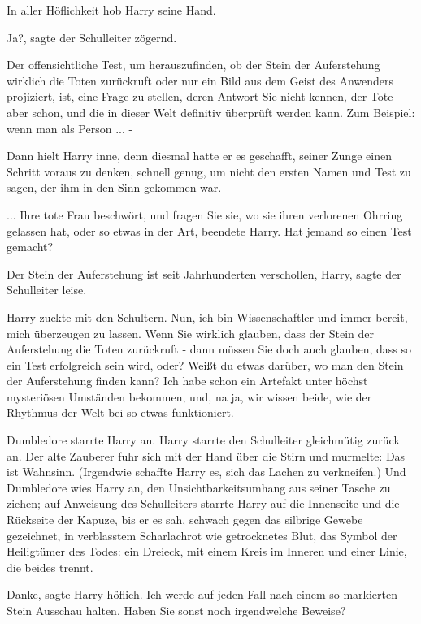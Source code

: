 In aller Höflichkeit hob Harry seine Hand.

\glqq{}Ja?\grqq{}, sagte der Schulleiter zögernd.

\glqq{}Der offensichtliche Test, um herauszufinden, ob der Stein der Auferstehung
wirklich die Toten zurückruft oder nur ein Bild aus dem Geist des Anwenders
projiziert, ist, eine Frage zu stellen, deren Antwort Sie nicht kennen, der Tote
aber schon, und die in dieser Welt definitiv überprüft werden kann. Zum
Beispiel: wenn man als Person ... -\grqq{}

Dann hielt Harry inne, denn diesmal hatte er es geschafft, seiner Zunge einen
Schritt voraus zu denken, schnell genug, um nicht den ersten Namen und Test zu
sagen, der ihm in den Sinn gekommen war.

\glqq{}... Ihre tote Frau beschwört, und fragen Sie sie, wo sie ihren verlorenen
Ohrring gelassen hat, oder so etwas in der Art\grqq{}, beendete Harry. \glqq{}Hat
jemand so einen Test gemacht?\grqq{}

\glqq{}Der Stein der Auferstehung ist seit Jahrhunderten verschollen,
Harry\grqq{}, sagte der Schulleiter leise.

Harry zuckte mit den Schultern. \glqq{}Nun, ich bin Wissenschaftler und immer
bereit, mich überzeugen zu lassen. Wenn Sie wirklich glauben, dass der Stein der
Auferstehung die Toten zurückruft - dann müssen Sie doch auch glauben, dass so
ein Test erfolgreich sein wird, oder? Weißt du etwas darüber, wo man den Stein
der Auferstehung finden kann? Ich habe schon ein Artefakt unter höchst
mysteriösen Umständen bekommen, und, na ja, wir wissen beide, wie der Rhythmus
der Welt bei so etwas funktioniert.\grqq{}

Dumbledore starrte Harry an. Harry starrte den Schulleiter gleichmütig zurück
an. Der alte Zauberer fuhr sich mit der Hand über die Stirn und murmelte: \glqq{}
Das ist Wahnsinn.\grqq{} (Irgendwie schaffte Harry es, sich das Lachen zu
verkneifen.) Und Dumbledore wies Harry an, den Unsichtbarkeitsumhang aus seiner
Tasche zu ziehen; auf Anweisung des Schulleiters starrte Harry auf die
Innenseite und die Rückseite der Kapuze, bis er es sah, schwach gegen das
silbrige Gewebe gezeichnet, in verblasstem Scharlachrot wie getrocknetes Blut,
das Symbol der Heiligtümer des Todes: ein Dreieck, mit einem Kreis im Inneren
und einer Linie, die beides trennt.

\glqq{}Danke\grqq{}, sagte Harry höflich. \glqq{}Ich werde auf jeden Fall nach
einem so markierten Stein Ausschau halten. Haben Sie sonst noch irgendwelche
Beweise?\grqq{}

